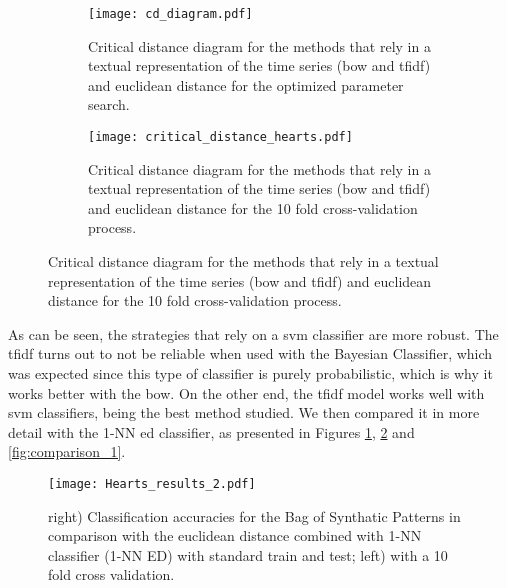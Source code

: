 \begin{figure}
	\begin{subfigure}{\linewidth}
    	\centering
    	\texttt{[image: cd\_diagram.pdf]}
    	\caption{Critical distance diagram for the methods that rely in a textual representation of the time series (\gls{bow} and \gls{tfidf}) and euclidean distance for the optimized parameter search.}
    \label{fig:cd_diagram1}
    \end{subfigure}
	\begin{subfigure}{\linewidth}
    	\centering
    	\texttt{[image: critical\_distance\_hearts.pdf]}
    	\caption{Critical distance diagram for the methods that rely in a textual representation of the time series (\gls{bow} and \gls{tfidf}) and euclidean distance for the 10 fold cross-validation process.}
    \end{subfigure}
    \label{fig:cd_diagram2}
\end{figure}

As can be seen, the strategies that rely on a \gls{svm} classifier are more robust. The \gls{tfidf} turns out to not be reliable when used with the Bayesian Classifier, which was expected since this type of classifier is purely probabilistic, which is why it works better with the \gls{bow}. On the other end, the \gls{tfidf} model works well with \gls{svm} classifiers, being the best method studied. We then compared it in more detail with the 1-NN \gls{ed} classifier, as presented in Figures \ref{fig:cd_diagram1}, \ref{fig:cd_diagram2} and \ref{fig:comparison_1}.

\begin{figure}[h]
    \centering
    \texttt{[image: Hearts\_results\_2.pdf]}
    \caption{right) Classification accuracies for the Bag of Synthatic Patterns in comparison with the euclidean distance combined with 1-NN classifier (1-NN ED) with standard train and test; left) with a 10 fold cross validation.}
    \label{fig:comparison_2}
\end{figure}

